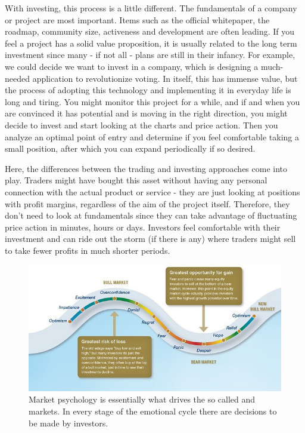 With investing, this process is a little different. The fundamentals of a company or project are most important. Items such as the official whitepaper, the roadmap, community size, activeness and development are often leading. If you feel a project has a solid value proposition, it is usually related to the long term investment since many - if not all - plans are still in their infancy. For example, we could decide we want to invest in a company, which is designing a much-needed application to revolutionize voting. In itself, this has immense value, but the process of adopting this technology and implementing it in everyday life is long and tiring. You might monitor this project for a while, and if and when you are convinced it has potential and is moving in the right direction, you might decide to invest and start looking at the charts and price action. Then you analyze an optimal point of entry and determine if you feel comfortable taking a small position, after which you can expand periodically if so desired.\medskip

Here, the differences between the trading and investing approaches come into play. Traders might have bought this asset without having any personal connection with the actual product or service - they are just looking at positions with profit margins, regardless of the aim of the project itself. Therefore, they don't need to look at fundamentals since they can take advantage of fluctuating price action in minutes, hours or days. Investors feel comfortable with their investment and can ride out the storm (if there is any) where traders might sell to take fewer profits in much shorter periods. 

\begin{figure}
    \centering
    \includegraphics[width=.95\textwidth]{img/ch-investing/bear_bullmarket.jpg}
    \caption[Bear and bull markets and market psychology]{Market psychology is essentially what drives the so called  and  markets. In every stage of the emotional cycle there are decisions to be made by investors.}
    \label{fig:bear_bullmarket}
\end{figure}

